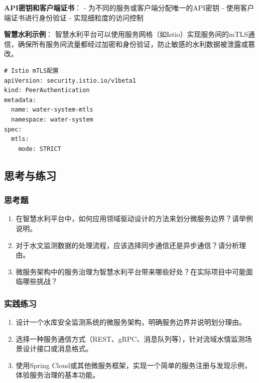 \textbf{API密钥和客户端证书}： - 为不同的服务或客户端分配唯一的API密钥 -
使用客户端证书进行身份验证 - 实现细粒度的访问控制

\textbf{智慧水利示例}：
智慧水利平台可以使用服务网格（如Istio）实现服务间的mTLS通信，确保所有服务间流量都经过加密和身份验证，防止敏感的水利数据被泄露或篡改。

\begin{lstlisting}
# Istio mTLS配置
apiVersion: security.istio.io/v1beta1
kind: PeerAuthentication
metadata:
  name: water-system-mtls
  namespace: water-system
spec:
  mtls:
    mode: STRICT
\end{lstlisting}

\subsection{思考与练习}\label{ux601dux8003ux4e0eux7ec3ux4e60}

\subsubsection{思考题}\label{ux601dux8003ux9898}

\begin{enumerate}
\def\labelenumi{\arabic{enumi}.}
\tightlist
\item
  在智慧水利平台中，如何应用领域驱动设计的方法来划分微服务边界？请举例说明。
\item
  对于水文监测数据的处理流程，应该选择同步通信还是异步通信？请分析理由。
\item
  微服务架构中的服务治理为智慧水利平台带来哪些好处？在实际项目中可能面临哪些挑战？
\end{enumerate}

\subsubsection{实践练习}\label{ux5b9eux8df5ux7ec3ux4e60}

\begin{enumerate}
\def\labelenumi{\arabic{enumi}.}
\tightlist
\item
  设计一个水库安全监测系统的微服务架构，明确服务边界并说明划分理由。
\item
  选择一种服务通信方式（REST、gRPC、消息队列等），针对流域水情监测场景设计接口或消息格式。
\item
  使用Spring
  Cloud或其他微服务框架，实现一个简单的服务注册与发现示例，体验服务治理的基本功能。
\end{enumerate}
